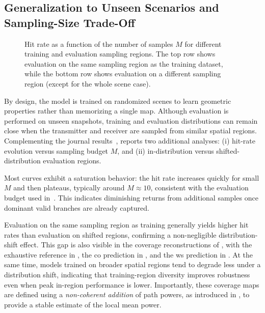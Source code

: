 \subsection{Generalization to Unseen Scenarios and Sampling-Size Trade-Off}

\begin{figure}
  \centering
  \caption{Hit rate as a function of the number of samples $M$ for different training and evaluation sampling regions. The top row shows evaluation on the same sampling region as the training dataset, while the bottom row shows evaluation on a different sampling region (except for the whole scene case).}
\end{figure}

By design, the model is trained on randomized scenes to learn geometric properties rather than memorizing a single map. Although evaluation is performed on unseen snapshots, training and evaluation distributions can remain close when the transmitter and receiver are sampled from similar spatial regions. Complementing the journal results~,  reports two additional analyses: (i) hit-rate evolution versus sampling budget $M$, and (ii) in-distribution versus shifted-distribution evaluation regions.

Most curves exhibit a saturation behavior: the hit rate increases quickly for small $M$ and then plateaus, typically around $M\approx 10$, consistent with the evaluation budget used in~. This indicates diminishing returns from additional samples once dominant valid branches are already captured.

Evaluation on the same sampling region as training generally yields higher hit rates than evaluation on shifted regions, confirming a non-negligible distribution-shift effect. This gap is also visible in the coverage reconstructions of , with the exhaustive reference in , the \gls{co} prediction in , and the \gls{ws} prediction in . At the same time, models trained on broader spatial regions tend to degrade less under a distribution shift, indicating that training-region diversity improves robustness even when peak in-region performance is lower. Importantly, these coverage maps are defined using a \emph{non-coherent addition} of path powers, as introduced in , to provide a stable estimate of the local mean power.

